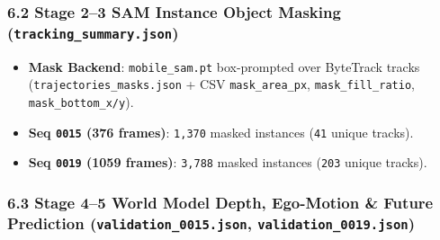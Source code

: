 \documentclass[10.5pt,a4paper]{article}
\begin{document}
\subsubsection{6.2 Stage 2--3 SAM Instance Object Masking (\texttt{tracking\_\allowbreak{}summary.\allowbreak{}json})}
\begin{itemize}[leftmargin=1.5em,itemsep=2pt]
\item \textbf{Mask Backend}: \texttt{mobile\_\allowbreak{}sam.\allowbreak{}pt} box-prompted over ByteTrack tracks (\texttt{trajectories\_\allowbreak{}masks.\allowbreak{}json} + CSV \texttt{mask\_\allowbreak{}area\_\allowbreak{}px}, \texttt{mask\_\allowbreak{}fill\_\allowbreak{}ratio}, \texttt{mask\_\allowbreak{}bottom\_\allowbreak{}x/\allowbreak{}y}).
\item \textbf{Seq \texttt{0015} (376 frames)}: \texttt{1,\allowbreak{}370} masked instances (\texttt{41} unique tracks).
\item \textbf{Seq \texttt{0019} (1059 frames)}: \texttt{3,\allowbreak{}788} masked instances (\texttt{203} unique tracks).
\end{itemize}

\subsubsection{6.3 Stage 4--5 World Model Depth, Ego-Motion \& Future Prediction (\texttt{validation\_\allowbreak{}0015.\allowbreak{}json}, \texttt{validation\_\allowbreak{}0019.\allowbreak{}json})}
\end{document}
